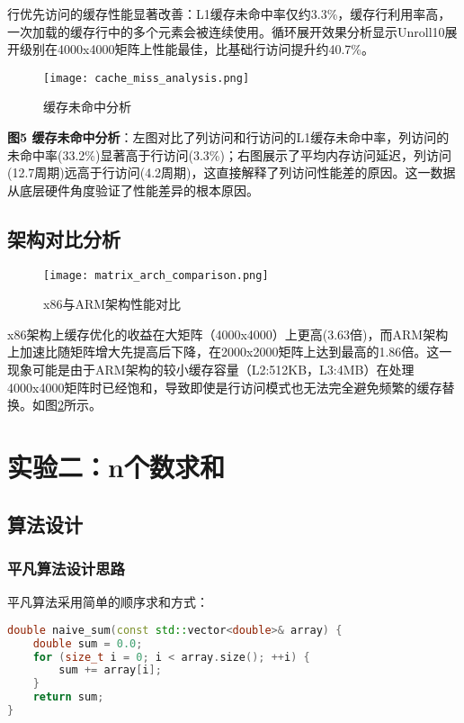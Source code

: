 \documentclass[a4paper,colorlinks=true,linkcolor=blue,urlcolor=blue,citecolor=green,bookmarks=true]{article}
\begin{document}
行优先访问的缓存性能显著改善：L1缓存未命中率仅约3.3\%，缓存行利用率高，一次加载的缓存行中的多个元素会被连续使用。循环展开效果分析显示Unroll10展开级别在4000x4000矩阵上性能最佳，比基础行访问提升约40.7\%。

\begin{figure}[htbp]
  \centering
  \texttt{[image: cache\_miss\_analysis.png]}
  \caption{缓存未命中分析}
  \label{fig:cache_miss}
\end{figure}

\textbf{图5 缓存未命中分析}：左图对比了列访问和行访问的L1缓存未命中率，列访问的未命中率(33.2\%)显著高于行访问(3.3\%)；右图展示了平均内存访问延迟，列访问(12.7周期)远高于行访问(4.2周期)，这直接解释了列访问性能差的原因。这一数据从底层硬件角度验证了性能差异的根本原因。

\subsection{架构对比分析}

\begin{figure}[htbp]
  \centering
  \texttt{[image: matrix\_arch\_comparison.png]}
  \caption{x86与ARM架构性能对比}
  \label{fig:arch_comparison}
\end{figure}

x86架构上缓存优化的收益在大矩阵（4000x4000）上更高(3.63倍)，而ARM架构上加速比随矩阵增大先提高后下降，在2000x2000矩阵上达到最高的1.86倍。这一现象可能是由于ARM架构的较小缓存容量（L2:512KB，L3:4MB）在处理4000x4000矩阵时已经饱和，导致即使是行访问模式也无法完全避免频繁的缓存替换。如图\ref{fig:arch_comparison}所示。

\section{实验二：n个数求和}

\subsection{算法设计}

\subsubsection{平凡算法设计思路}

平凡算法采用简单的顺序求和方式：

\begin{lstlisting}[language=C++]
double naive_sum(const std::vector<double>& array) {
    double sum = 0.0;
    for (size_t i = 0; i < array.size(); ++i) {
        sum += array[i];
    }
    return sum;
}
\end{lstlisting}
\end{document}
